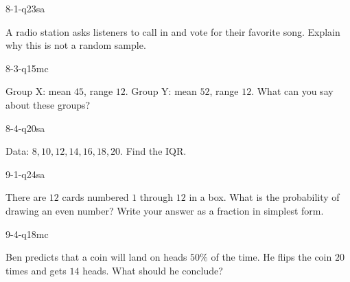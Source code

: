 \begin{practiceQuestion}{8-1-q23}{sa}
\begin{questionText}
A radio station asks listeners to call in and vote for their favorite song. Explain why this is not a random sample.
\end{questionText}
\end{practiceQuestion}

\begin{practiceQuestion}{8-3-q15}{mc}
\begin{questionText}
Group X: mean $45$, range $12$. Group Y: mean $52$, range $12$. What can you say about these groups?
\end{questionText}
\end{practiceQuestion}

\begin{practiceQuestion}{8-4-q20}{sa}
\begin{questionText}
Data: $8, 10, 12, 14, 16, 18, 20$. Find the IQR.
\end{questionText}
\end{practiceQuestion}

\begin{practiceQuestion}{9-1-q24}{sa}
\begin{questionText}
There are $12$ cards numbered $1$ through $12$ in a box. What is the probability of drawing an even number? Write your answer as a fraction in simplest form.
\end{questionText}
\end{practiceQuestion}

\begin{practiceQuestion}{9-4-q18}{mc}
\begin{questionText}
Ben predicts that a coin will land on heads $50\%$ of the time. He flips the coin $20$ times and gets $14$ heads. What should he conclude?
\end{questionText}
\end{practiceQuestion}

